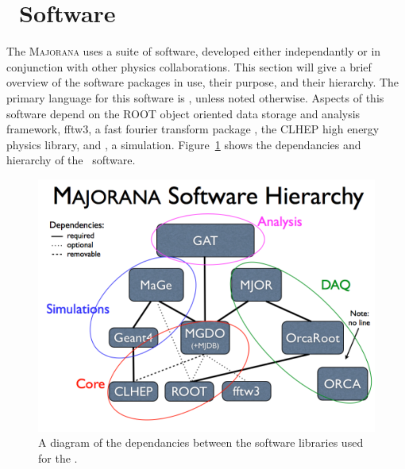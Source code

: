 \documentclass[/main.tex]{subfiles}
\begin{document}
\section{\MJD\ Software}
The \textsc{Majorana} uses a suite of software, developed either independantly or in conjunction with other physics collaborations.
This section will give a brief overview of the software packages in use, their purpose, and their hierarchy.
The primary language for this software is \cpp, unless noted otherwise.
Aspects of this software depend on the ROOT object oriented data storage and analysis framework\cite{rootcern}, fftw3, a fast fourier transform package \cite{fftw3}, the CLHEP high energy physics library\cite{clhep}, and \geant, a simulation\cite{geant2003}.
Figure~\ref{fig:swhierarchy} shows the dependancies and hierarchy of the \MJD\ software.
\begin{figure}
  \centering
  \includegraphics[width=\textwidth]{SoftwareHierarchy}
  \caption[\MJD\ software hierarchy]{\label{fig:swhierarchy}
    A diagram of the dependancies between the software libraries used for the \MJD.
  }
\end{figure}
\\
\end{document}
